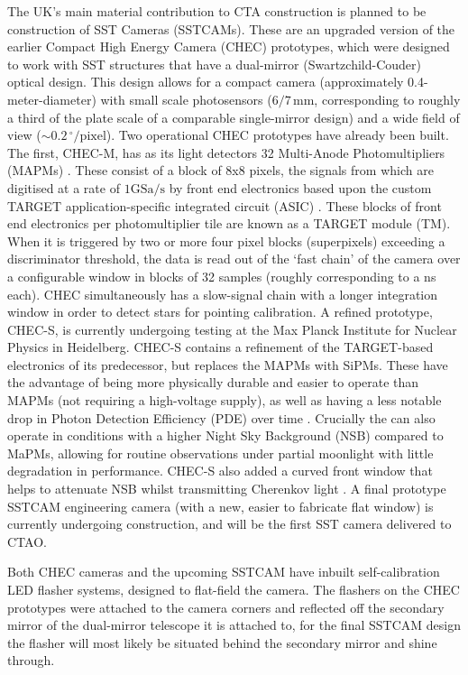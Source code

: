 The UK's main material contribution to CTA construction is planned to be construction of SST Cameras (SSTCAMs). These are an upgraded version of the earlier Compact High Energy Camera (CHEC) prototypes, which were designed to work with SST structures that have a dual-mirror (Swartzchild-Couder) optical design. This design allows for a compact camera (approximately 0.4-meter-diameter) with small scale photosensors ($\mathrm{6/7\,mm}$, corresponding to roughly a third of the plate scale of a comparable single-mirror design) and a wide field of view ($\mathrm{\sim0.2\,^{\circ}/pixel}$).  Two operational CHEC prototypes have already been built. The first, CHEC-M, has as its light detectors 32 Multi-Anode Photomultipliers (MAPMs) \cite{tomthesis}. These consist of a block of 8x8 pixels, the signals from which are digitised at a rate of $1\mathrm{GSa}/\mathrm{s}$ \cite{tomthesis} by front end electronics based upon the custom TARGET application-specific integrated circuit (ASIC) \cite{checmpaper}. These blocks of front end electronics per photomultiplier tile are known as a TARGET module (TM). When it is triggered by two or more four pixel blocks (superpixels) exceeding a discriminator threshold, the data is read out of the `fast chain' of the camera over a configurable window in blocks of 32 samples (roughly corresponding to a ns each). CHEC simultaneously has a slow-signal chain with a longer integration window in order to detect stars for pointing calibration. A refined prototype, CHEC-S, is currently undergoing testing at the Max Planck Institute for Nuclear Physics in Heidelberg. CHEC-S contains a refinement of the TARGET-based electronics of its predecessor, but replaces the MAPMs with SiPMs. These have the advantage of being more physically durable and easier to operate than MAPMs (not requiring a high-voltage supply), as well as having a less notable drop in Photon Detection Efficiency (PDE) over time \cite{factphotonstream}. Crucially the can also operate in conditions with a higher Night Sky Background (NSB) compared to MaPMs, allowing for routine observations under partial moonlight with little degradation in performance. CHEC-S also added a curved front window that helps to attenuate NSB whilst transmitting Cherenkov light \cite{ssticrc}. A final prototype SSTCAM engineering camera (with a new, easier to fabricate flat window) is currently undergoing construction, and will be the first SST camera delivered to CTAO.

Both CHEC cameras and the upcoming SSTCAM have inbuilt self-calibration LED flasher systems, designed to flat-field the camera. The flashers on the CHEC prototypes were attached to the camera corners and reflected off the secondary mirror of the dual-mirror telescope it is attached to, for the final SSTCAM design the flasher will most likely be situated behind the secondary mirror and shine through. 

